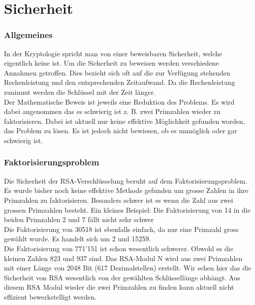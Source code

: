 \part{Sicherheit}
\section{Allgemeines}
In der Kryptologie spricht man von einer beweisbaren Sicherheit, welche eigentlich keine ist. Um die Sicherheit zu beweisen werden verschiedene Annahmen getroffen. Dies bezieht sich oft auf die zur Verfügung stehenden Rechenleistung und den entsprechenden Zeitaufwand. Da die Rechenleistung zunimmt werden die Schlüssel mit der Zeit länger. \\
Der Mathematische Beweis ist jeweils eine Reduktion des Problems. Es wird dabei angenommen das es schwierig ist z. B. zwei Primzahlen wieder zu faktorisieren. Dabei ist aktuell nur keine effektive Möglichkeit gefunden worden, das Problem zu lösen. Es ist jedoch nicht bewiesen, ob es unmöglich oder gar schwierig ist.

\section{Faktorisierungsproblem}
Die Sicherheit der RSA-Verschlüsselung beruht auf dem Faktorisierungsproblem. Es wurde bisher noch keine effektive Methode gefunden um grosse Zahlen in ihre Primzahlen zu faktorisieren. Besonders schwer ist es wenn die Zahl aus zwei grossen Primzahlen besteht. 
Ein kleines Beispiel:
Die Faktorisierung von 14 in die beiden Primzahlen 2 und 7 fällt nicht sehr schwer\\
Die Faktorisierung von 30518 ist ebenfalls einfach, da nur eine Primzahl gross gewählt wurde. Es handelt sich um 2 und 15259. \\
Die Faktorisierung von 771'151 ist schon wesentlich schwerer. Obwohl es die kleinen Zahlen 823 und 937 sind. Das RSA-Modul N wird aus zwei Primzahlen mit einer Länge von 2048 Bit (617 Dezimalstellen) erstellt. Wir sehen hier das die Sicherheit von RSA wesentlich von der gewählten Schlüssellänge abhängt. Aus diesem RSA Modul wieder die zwei Primzahlen zu finden kann aktuell nicht effizient bewerkstelligt werden.
%
